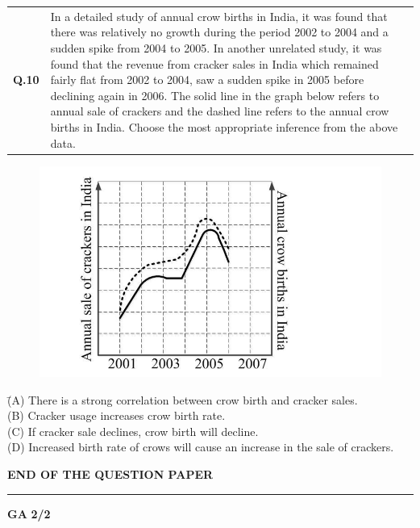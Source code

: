 \documentclass{article}
\begin{document}
\vspace{0.3cm}

\noindent
\begin{tabular}
{@{}ll} 
\textbf{Q.10} & \parbox[t]{0.85\textwidth}{In a detailed study of annual crow births in India, it was found that there was relatively no growth during the period 2002 to 2004 and a sudden spike from 2004 to 2005. In another unrelated study, it was found that the revenue from cracker sales in India which remained fairly flat from 2002 to 2004, saw a sudden spike in 2005 before declining again in 2006. The solid line in the graph below refers to annual sale of crackers and the dashed line refers to the annual crow births in India. Choose the most appropriate inference from the above data.}

\end{tabular}

\begin{figure}[h!]
    \centering
    \includegraphics[width=0.5\linewidth]{Figs/10i.png}
\end{figure}







\noindent
\begin{tabbing}
\hspace{1.5cm} \= (A) There is a strong correlation between crow birth and cracker sales. \\
\> (B) Cracker usage increases crow birth rate. \\
\> (C) If cracker sale declines, crow birth will decline. \\
\> (D) Increased birth rate of crows will cause an increase in the sale of crackers.
\end{tabbing}

\vspace{2em}

\begin{center}
    \textbf{END OF THE QUESTION PAPER}
\end{center}

 \hrule
\vspace{0.3cm}
\textbf{GA} \hfill  \textbf{2/2}
\end{document}

